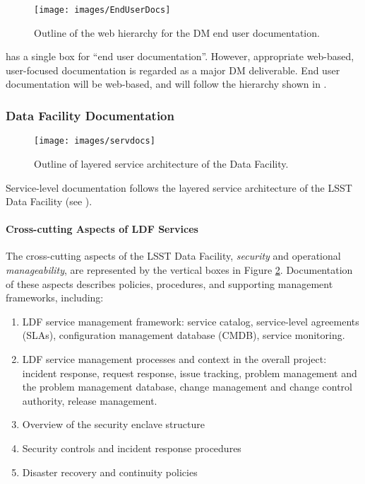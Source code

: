\begin{figure}
\begin{center}
 \texttt{[image: images/EndUserDocs]}
\caption{Outline of the web hierarchy for the DM end user documentation. \label{fig:eudoc}}
\end{center}
\end{figure}

 has a single box for ``end user documentation''. However, appropriate web-based, user-focused documentation is regarded as a major DM deliverable.
End user documentation will be web-based, and will follow the hierarchy shown in .

\subsubsection{Data Facility Documentation}

\begin{figure}
\begin{center}
 \texttt{[image: images/servdocs]}
\caption{Outline of layered service architecture of the Data Facility. \label{fig:servdoc}}
\end{center}
\end{figure}

Service-level documentation follows the layered service architecture of the LSST Data Facility (see ).

\paragraph{Cross-cutting Aspects of \gls{LDF} Services}

The cross-cutting aspects of the LSST Data Facility, \textit{security} and operational \textit{manageability}, are represented by the vertical boxes in Figure \ref{fig:servdoc}.
Documentation of these aspects describes policies, procedures, and supporting management frameworks, including:

\begin{enumerate}
	\item	\gls{LDF} service management framework: service catalog, service-level agreements (SLAs), \gls{configuration} management database (\gls{CMDB}), service \gls{monitoring}.
	\item	LDF service management processes and context in the overall project: incident response, request response, issue tracking, problem management and the problem management database, change management and change control authority, release management.
	\item	Overview of the security enclave structure
	\item	Security controls and incident response procedures
	\item	Disaster recovery and continuity policies
\end{enumerate}

